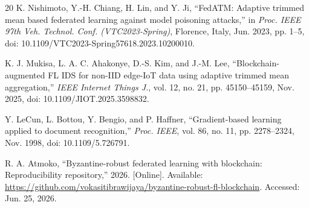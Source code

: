 \documentclass[10pt,letterpaper]{article}
\begin{document}
\begin{thebibliography}{20}
K. Nishimoto, Y.-H. Chiang, H. Lin, and Y. Ji,
``FedATM: Adaptive trimmed mean based federated learning against model poisoning
attacks,'' in \emph{Proc. IEEE 97th Veh. Technol. Conf. (VTC2023-Spring)},
Florence, Italy, Jun. 2023, pp. 1--5,
doi: 10.1109/VTC2023-Spring57618.2023.10200010.

K. J. Mukisa, L. A. C. Ahakonye, D.-S. Kim, and J.-M. Lee,
``Blockchain-augmented FL IDS for non-IID edge-IoT data using adaptive trimmed
mean aggregation,''
\emph{IEEE Internet Things J.}, vol. 12, no. 21, pp. 45150--45159, Nov. 2025,
doi: 10.1109/JIOT.2025.3598832.

Y. LeCun, L. Bottou, Y. Bengio, and P. Haffner,
``Gradient-based learning applied to document recognition,''
\emph{Proc. IEEE}, vol. 86, no. 11, pp. 2278--2324, Nov. 1998,
doi: 10.1109/5.726791.

R. A. Atmoko, ``Byzantine-robust federated learning with blockchain:
Reproducibility repository,'' 2026. [Online]. Available:
\url{https://github.com/vokasitibrawijaya/byzantine-robust-fl-blockchain}.
Accessed: Jun. 25, 2026.

\end{thebibliography}
\end{document}

